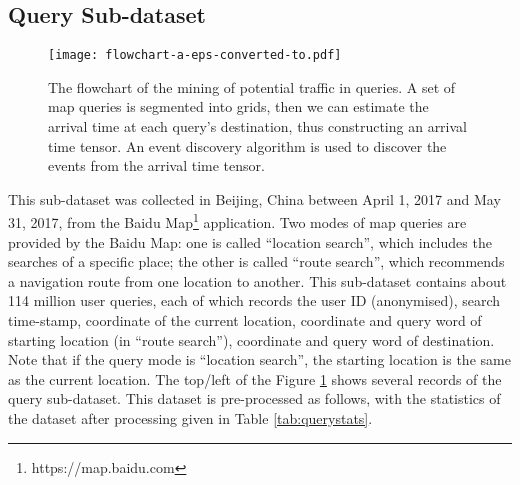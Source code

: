 \subsection{Query Sub-dataset}
\label{sec:query_sub_dataset}

\begin{figure}[htbp]
\centering
{\texttt{[image: flowchart-a-eps-converted-to.pdf]}}
\caption{The flowchart of the mining of potential traffic in queries. A set of map queries is segmented into grids, then we can estimate the arrival time at each query's destination, thus constructing an arrival time tensor. An event discovery algorithm is used to discover the events from the arrival time tensor.}
\label{fig:querypreprocess}
\end{figure}

This sub-dataset was collected in Beijing, China between April 1, 2017 and May 31, 2017, from the Baidu Map\footnote{https://map.baidu.com} application. Two modes of map queries are provided by the Baidu Map: one is called ``location search'', which includes the searches of a specific place; the other is called ``route search'', which recommends a navigation route from one location to another. This sub-dataset contains about 114 million user queries, each of which records the user ID  (anonymised), search time-stamp, coordinate of the current location, coordinate and query word of starting location  (in ``route search''), coordinate and query word of destination. Note that if the query mode is ``location search'', the starting location is the same as the current location. The top/left of the Figure \ref{fig:querypreprocess} shows several records of the query sub-dataset. This dataset is pre-processed as follows, with the statistics of the dataset after processing given in Table \ref{tab:querystats}.

